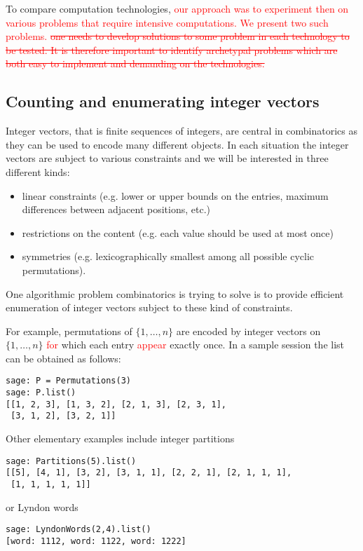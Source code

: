 \documentclass{deliverablereport}
\begin{document}
To compare computation technologies, \textcolor{red}{our approach was to experiment
then on various problems that require intensive computations. We present two such problems. }
\textcolor{red}{\sout{one needs to develop solutions to some problem in
each technology to be tested. It is therefore important to identify archetypal
problems which are both easy to implement and demanding on the technologies.
}}

\subsection{Counting and enumerating integer vectors}
\label{subsec:intro:integer:vectors}

Integer vectors, that is finite sequences of integers, are central
in combinatorics as they can be used to encode many different
objects. In each situation the integer vectors are subject to various
constraints and we will be interested in three different kinds:
\begin{itemize}
\item linear constraints (e.g. lower or upper bounds on the entries,
maximum differences between adjacent positions, etc.)
\item restrictions on the content (e.g. each value should be used
at most once)
\item symmetries (e.g. lexicographically smallest among all possible
cyclic permutations).
\end{itemize}
One algorithmic problem combinatorics is trying to solve is to provide
efficient enumeration of integer vectors subject to these kind of
constraints.

For example, permutations of $\{1, \ldots, n\}$ are encoded by integer vectors
on $\{1, \ldots, n\}$ \textcolor{red}{for} which each entry \textcolor{red}{appear} exactly once. In a sample
\Sage session the list can be obtained as follows:
\begin{verbatim}
sage: P = Permutations(3)
sage: P.list()
[[1, 2, 3], [1, 3, 2], [2, 1, 3], [2, 3, 1],
 [3, 1, 2], [3, 2, 1]]
\end{verbatim}
Other elementary examples include integer partitions
\begin{verbatim}
sage: Partitions(5).list()
[[5], [4, 1], [3, 2], [3, 1, 1], [2, 2, 1], [2, 1, 1, 1],
 [1, 1, 1, 1, 1]]
\end{verbatim}
or Lyndon words
\begin{verbatim}
sage: LyndonWords(2,4).list()
[word: 1112, word: 1122, word: 1222]
\end{verbatim}
\end{document}
